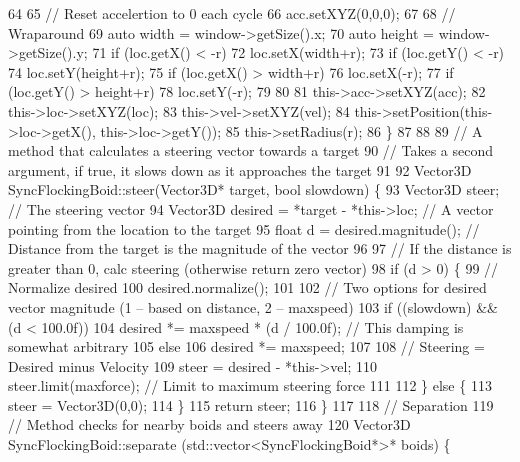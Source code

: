 \begin{DoxyCodeInclude}
64     
65     \textcolor{comment}{// Reset accelertion to 0 each cycle}
66     acc.setXYZ(0,0,0);
67     
68     \textcolor{comment}{// Wraparound}
69     \textcolor{keyword}{auto} width = window->getSize().x;
70     \textcolor{keyword}{auto} height = window->getSize().y;
71     \textcolor{keywordflow}{if} (loc.getX() < -r)
72         loc.setX(width+r);
73     \textcolor{keywordflow}{if} (loc.getY() < -r)
74         loc.setY(height+r);
75     \textcolor{keywordflow}{if} (loc.getX() > width+r)
76         loc.setX(-r);
77     \textcolor{keywordflow}{if} (loc.getY() > height+r)
78         loc.setY(-r);
79     
80     
81     this->acc->setXYZ(acc);
82     this->loc->setXYZ(loc);
83     this->vel->setXYZ(vel);
84     this->setPosition(this->loc->getX(), this->loc->getY());
85     this->setRadius(r);
86 \}
87 
88 
89 \textcolor{comment}{// A method that calculates a steering vector towards a target}
90 \textcolor{comment}{// Takes a second argument, if true, it slows down as it approaches the target}
91 
92 Vector3D SyncFlockingBoid::steer(Vector3D* target, \textcolor{keywordtype}{bool} slowdown) \{
93     Vector3D steer;  \textcolor{comment}{// The steering vector}
94     Vector3D desired = *target - *this->loc;  \textcolor{comment}{// A vector pointing from the location to the target}
95     \textcolor{keywordtype}{float} d = desired.magnitude(); \textcolor{comment}{// Distance from the target is the magnitude of the vector}
96     
97     \textcolor{comment}{// If the distance is greater than 0, calc steering (otherwise return zero vector)}
98     \textcolor{keywordflow}{if} (d > 0) \{
99         \textcolor{comment}{// Normalize desired}
100         desired.normalize();
101         
102         \textcolor{comment}{// Two options for desired vector magnitude (1 -- based on distance, 2 -- maxspeed)}
103         \textcolor{keywordflow}{if} ((slowdown) && (d < 100.0f))
104             desired *= maxspeed * (d / 100.0f); \textcolor{comment}{// This damping is somewhat arbitrary}
105         \textcolor{keywordflow}{else}
106             desired *= maxspeed;
107         
108         \textcolor{comment}{// Steering = Desired minus Velocity}
109         steer = desired - *this->vel;
110         steer.limit(maxforce);  \textcolor{comment}{// Limit to maximum steering force}
111         
112     \} \textcolor{keywordflow}{else} \{
113         steer = Vector3D(0,0);
114     \}
115     \textcolor{keywordflow}{return} steer;
116 \}
117 
118 \textcolor{comment}{// Separation}
119 \textcolor{comment}{// Method checks for nearby boids and steers away}
120 Vector3D SyncFlockingBoid::separate (std::vector<SyncFlockingBoid*>* boids) \{

\end{DoxyCodeInclude}
